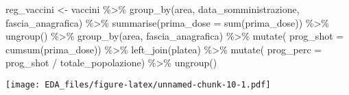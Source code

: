 \documentclass[
]{article}
\newenvironment{Shaded}{\begin{snugshade}}{\end{snugshade}}
\newcommand{\AttributeTok}[1]{\textcolor[rgb]{0.77,0.63,0.00}{#1}}
\newcommand{\FunctionTok}[1]{\textcolor[rgb]{0.00,0.00,0.00}{#1}}
\newcommand{\NormalTok}[1]{#1}
\newcommand{\OtherTok}[1]{\textcolor[rgb]{0.56,0.35,0.01}{#1}}
\newcommand{\SpecialCharTok}[1]{\textcolor[rgb]{0.00,0.00,0.00}{#1}}
\begin{document}
\begin{Shaded}
\begin{Highlighting}[]
\NormalTok{reg\_vaccini }\OtherTok{\textless{}{-}}\NormalTok{ vaccini }\SpecialCharTok{\%\textgreater{}\%}
  \FunctionTok{group\_by}\NormalTok{(area, data\_somministrazione, fascia\_anagrafica) }\SpecialCharTok{\%\textgreater{}\%} 
  \FunctionTok{summarise}\NormalTok{(}\AttributeTok{prima\_dose =} \FunctionTok{sum}\NormalTok{(prima\_dose)) }\SpecialCharTok{\%\textgreater{}\%} 
  \FunctionTok{ungroup}\NormalTok{() }\SpecialCharTok{\%\textgreater{}\%} 
  \FunctionTok{group\_by}\NormalTok{(area, fascia\_anagrafica) }\SpecialCharTok{\%\textgreater{}\%} 
  \FunctionTok{mutate}\NormalTok{( }\AttributeTok{prog\_shot =} \FunctionTok{cumsum}\NormalTok{(prima\_dose)) }\SpecialCharTok{\%\textgreater{}\%} 
  \FunctionTok{left\_join}\NormalTok{(platea) }\SpecialCharTok{\%\textgreater{}\%} 
  \FunctionTok{mutate}\NormalTok{( }\AttributeTok{prog\_perc =}\NormalTok{ prog\_shot }\SpecialCharTok{/}\NormalTok{ totale\_popolazione) }\SpecialCharTok{\%\textgreater{}\%} 
  \FunctionTok{ungroup}\NormalTok{()}
\end{Highlighting}
\end{Shaded}

\texttt{[image: EDA\_files/figure-latex/unnamed-chunk-10-1.pdf]}
\end{document}
